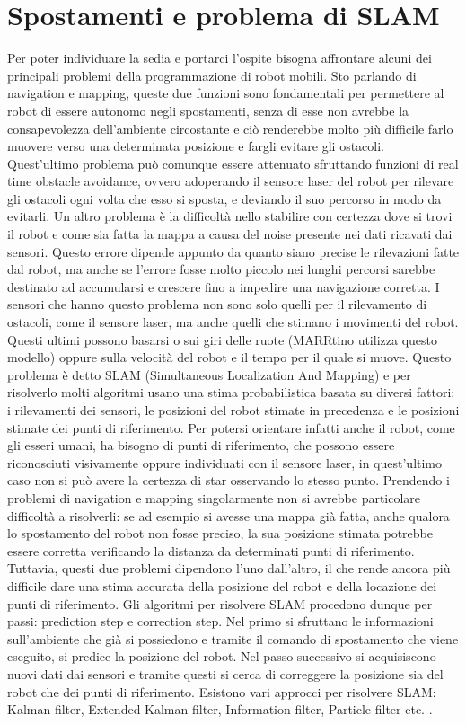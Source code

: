 \documentclass[italian, twoside]{sapthesis} %
\begin{document}
\section{Spostamenti e problema di SLAM}
Per poter individuare la sedia e portarci l'ospite bisogna affrontare alcuni dei principali problemi della programmazione di robot mobili. Sto parlando di navigation e mapping, queste due funzioni sono fondamentali per permettere al robot di essere autonomo negli spostamenti, senza di esse non avrebbe la consapevolezza dell’ambiente circostante e ciò renderebbe molto più difficile farlo muovere verso una determinata posizione e fargli evitare gli ostacoli. Quest’ultimo problema può comunque essere attenuato sfruttando funzioni di real time obstacle avoidance, ovvero adoperando il sensore laser del robot per rilevare gli ostacoli ogni volta che esso si sposta, e deviando il suo percorso in modo da evitarli. Un altro problema è la difficoltà nello stabilire con certezza dove si trovi il robot e come sia fatta la mappa a causa del noise presente nei dati ricavati dai sensori. Questo errore dipende appunto da quanto siano precise le rilevazioni fatte dal robot, ma anche se l’errore fosse molto piccolo nei lunghi percorsi sarebbe destinato ad accumularsi e crescere fino a impedire una navigazione corretta. I sensori che hanno questo problema non sono solo quelli per il rilevamento di ostacoli, come il sensore laser, ma anche quelli che stimano i movimenti del robot. Questi ultimi possono basarsi o sui giri delle ruote (MARRtino utilizza questo modello) oppure sulla velocità del robot e il tempo per il quale si muove. Questo problema è detto SLAM (Simultaneous Localization And Mapping) e per risolverlo molti algoritmi usano una stima probabilistica basata su diversi fattori: i rilevamenti dei sensori, le posizioni del robot stimate in precedenza e le posizioni stimate dei punti di riferimento. Per potersi orientare infatti anche il robot, come gli esseri umani, ha bisogno di punti di riferimento, che possono essere riconosciuti visivamente oppure individuati con il sensore laser, in quest’ultimo caso non si può avere la certezza di star osservando lo stesso punto. Prendendo i problemi di navigation e mapping singolarmente non si avrebbe particolare difficoltà a risolverli: se ad esempio si avesse una mappa già fatta, anche qualora lo spostamento del robot non fosse preciso, la sua posizione stimata potrebbe essere corretta verificando la distanza da determinati punti di riferimento. Tuttavia, questi due problemi dipendono l’uno dall’altro, il che rende ancora più difficile dare una stima accurata della posizione del robot e della locazione dei punti di riferimento. Gli algoritmi per risolvere SLAM procedono dunque per passi: prediction step e correction step. Nel primo si sfruttano le informazioni sull’ambiente che già si possiedono e tramite il comando di spostamento che viene eseguito, si predice la posizione del robot. Nel passo successivo si acquisiscono nuovi dati dai sensori e tramite questi si cerca di correggere la posizione sia del robot che dei punti di riferimento. Esistono vari approcci per risolvere SLAM: Kalman filter, Extended Kalman filter, Information filter, Particle filter etc. \cite{sebastian2005probabilistic}.
\end{document}

